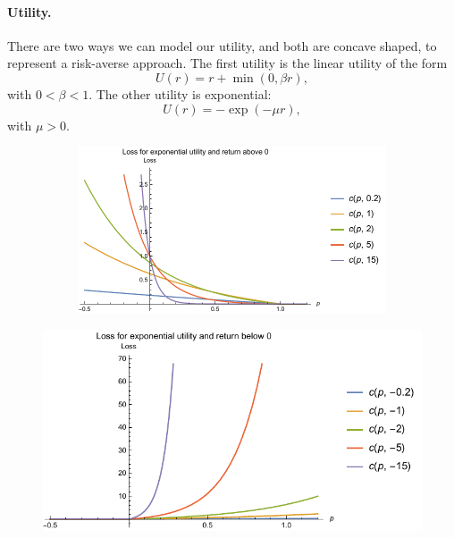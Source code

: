 \documentclass[11pt]{article}
\theoremstyle{plain}
\theoremstyle{definition}
\begin{document}
\paragraph{Utility.}
There are two ways we can model our utility, and both are concave shaped, to represent a
risk-averse approach. The first utility is the linear utility of the form
\begin{equation}
  U(r) = r + \min(0, \beta r),
\end{equation}
with $0<\beta<1$. The other utility is exponential:
\begin{equation}
  U(r) = -\exp(-\mu r),
\end{equation}
with $\mu > 0$.

\begin{figure}
  \centering
  \begin{subfigure}{.4\textwidth}
  \includegraphics[width=1.1\textwidth]{ExpULossAboveZero.pdf}
\end{subfigure}%
\begin{minipage}{.4\textwidth}
  \includegraphics[width=1.1\textwidth]{ExpULossBelowZero.pdf}
\end{minipage}
\end{figure}
\end{document}
